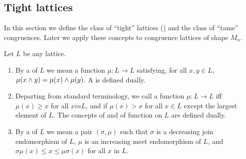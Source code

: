 \subsection{Tight lattices} In this section we define the class of ``tight'' lattices
(\cite[Definition 1.6]{HM:1988}) and the class of ``tame'' congruences. 
Later we apply these concepts to congruence lattices of shape $M_n$.

\begin{definition}
Let $L$ be any lattice.
\begin{enumerate}
\item 
By a  of $L$ we mean a function 
$\mu : L \to L$ satisfying, for all $x, y \in L$,
$\mu(x\wedge y) = \mu(x) \wedge \mu(y)$.
A  is defined dually.
\item Departing from standard terminology, 
we call a function $\mu: L \to L$ 
iff $\mu(x) \geq x$ for all $x in L$, and 
if $\mu(x) > x$ for all $x\in L$ except the largest element of $L$.
The concepts of  and of 
function on $L$ are defined dually.
\item By a  of $L$ we mean a pair $(\sigma, \mu)$ 
such that $\sigma$ is a decreasing join endomorphism of $L$, $\mu$ 
is an increasing meet endomorphism of $L$, and
$\sigma\mu(x) \leq x \leq \mu\sigma(x)$ for all $x$ in $L$.
\end{enumerate}
\end{definition}


